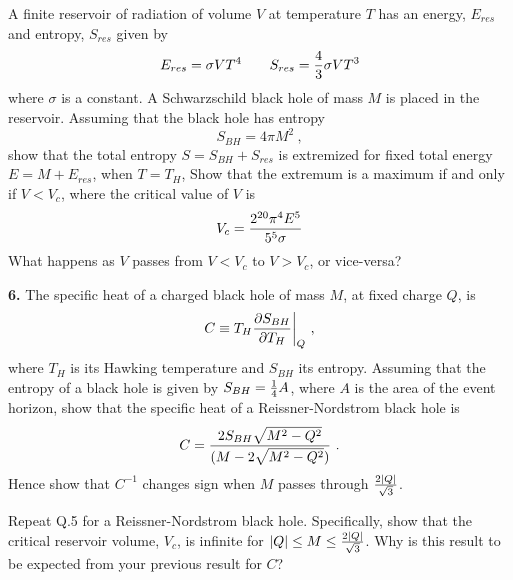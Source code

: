 A finite reservoir of radiation of volume $V$ at temperature $T$ has
an energy, $E_{res}$ and entropy, $S_{res}$ given by
$$
E_{res} = \sigma VT^4 \qquad S_{res} ={4\over3}\sigma VT^3
$$
where $\sigma$ is a constant. A Schwarzschild black hole of mass $M$ is
placed in the reservoir. Assuming that the black hole has entropy
$$
S_{BH} =4\pi M^2\ ,
$$
show that the total entropy $S= S_{BH}+S_{res}$ is extremized 
for fixed total energy $E= M+E_{res}$, when $T=T_H$, Show that the
extremum is a maximum if and only if $V<V_c$, where the critical value
of $V$ is $$
V_c = {2^{20}\pi^4E^5\over 5^5\sigma }
$$
What happens as $V$ passes from $V<V_c$ to $V>V_c$, or
vice-versa?


\vskip 10pt
\noindent
{\bf 6.} The specific heat of a charged black hole of mass $M$, at
fixed charge $Q$, is 
$$
C\equiv T_H {\partial S_{BH}\over \partial
T_H}\bigg|_Q \ ,
$$
where $T_H$ is its Hawking temperature and $S_{BH}$ its
entropy. Assuming that the entropy of a black hole is given by $S_{BH}=
{1\over4}A$, where $A$ is the area of the event horizon, show that the
specific heat of a Reissner-Nordstrom black hole is
$$
C= {2S_{BH}\sqrt{M^2-Q^2}\over (M-2\sqrt{M^2-Q^2})}\ .
$$
Hence show that $C^{-1}$ changes sign when $M$ passes through
${2|Q|\over\sqrt{3}}$. 

Repeat Q.5 for a Reissner-Nordstrom black hole.
Specifically, show that the critical reservoir volume, $V_c$, is
infinite for $|Q|\le M \le {2|Q|\over\sqrt{3}}$. Why is this result
to be expected from your previous result for $C$? 












